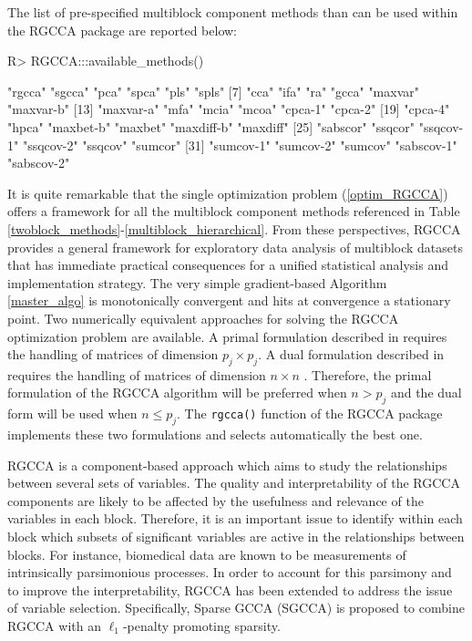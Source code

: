 \documentclass[
]{jss}
\begin{document}
The list of pre-specified multiblock component methods than can be used
within the RGCCA package are reported below:

\footnotesize

\begin{CodeChunk}
\begin{CodeInput}
R> RGCCA:::available_methods()
\end{CodeInput}
\begin{CodeOutput}
 [1] "rgcca"     "sgcca"     "pca"       "spca"      "pls"       "spls"     
 [7] "cca"       "ifa"       "ra"        "gcca"      "maxvar"    "maxvar-b" 
[13] "maxvar-a"  "mfa"       "mcia"      "mcoa"      "cpca-1"    "cpca-2"   
[19] "cpca-4"    "hpca"      "maxbet-b"  "maxbet"    "maxdiff-b" "maxdiff"  
[25] "sabscor"   "ssqcor"    "ssqcov-1"  "ssqcov-2"  "ssqcov"    "sumcor"   
[31] "sumcov-1"  "sumcov-2"  "sumcov"    "sabscov-1" "sabscov-2"
\end{CodeOutput}
\end{CodeChunk}

\normalsize

It is quite remarkable that the single optimization problem
(\ref{optim_RGCCA}) offers a framework for all the multiblock component
methods referenced in Table
\ref{twoblock_methods}-\ref{multiblock_hierarchical}. From these
perspectives, RGCCA provides a general framework for exploratory data
analysis of multiblock datasets that has immediate practical
consequences for a unified statistical analysis and implementation
strategy. The very simple gradient-based Algorithm \ref{master_algo} is
monotonically convergent and hits at convergence a stationary point. Two
numerically equivalent approaches for solving the RGCCA optimization
problem are available. A primal formulation described in
\citep[\citet{Tenenhaus2017}]{Tenenhaus2011} requires the handling of
matrices of dimension \(p_j \times p_j\). A dual formulation described
in \citep{Tenenhaus2015} requires the handling of matrices of dimension
\(n \times n\) . Therefore, the primal formulation of the RGCCA
algorithm will be preferred when \(n>p_j\) and the dual form will be
used when \(n \le p_j\). The \texttt{rgcca()} function of the RGCCA
package implements these two formulations and selects automatically the
best one.

RGCCA is a component-based approach which aims to study the
relationships between several sets of variables. The quality and
interpretability of the RGCCA components are likely to be affected by
the usefulness and relevance of the variables in each block. Therefore,
it is an important issue to identify within each block which subsets of
significant variables are active in the relationships between blocks.
For instance, biomedical data are known to be measurements of
intrinsically parsimonious processes. In order to account for this
parsimony and to improve the interpretability, RGCCA has been extended
to address the issue of variable selection. Specifically, Sparse GCCA
(SGCCA) is proposed to combine RGCCA with an \(\ell_1\)-penalty
promoting sparsity.
\end{document}
